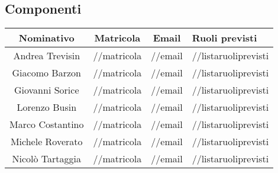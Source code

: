 \subsection*{Componenti}
\begin{center}
  \begin{tabular}{ c | c | c | p{5cm} |}
    \hline
    \textbf{Nominativo} & \textbf{Matricola} & \textbf{Email} & \textbf{Ruoli previsti} \\ \hline
    Andrea Trevisin & //matricola & //email & //listaruoliprevisti   \\ \hline
    Giacomo Barzon & //matricola & //email & //listaruoliprevisti \\ \hline
    Giovanni Sorice & //matricola & //email & //listaruoliprevisti \\ \hline
    Lorenzo Busin & //matricola & //email & //listaruoliprevisti \\ \hline
    Marco Costantino & //matricola & //email & //listaruoliprevisti \\ \hline
    Michele Roverato & //matricola & //email & //listaruoliprevisti \\ \hline
    Nicolò Tartaggia & //matricola & //email & //listaruoliprevisti \\ 
    \hline
  \end{tabular}
\end{center}
\pagebreak